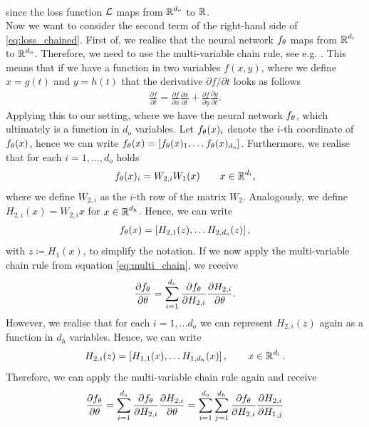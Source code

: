 \begin{example}
\begin{enumerate}
\begin{align*}
\end{align*}
since the loss function $\operatorname{\mathcal{L}}$ maps from $\operatorname{\mathbb{R}}^{d_o}$ to $\operatorname{\mathbb{R}}$.\\
Now we want to consider the second term of the right-hand side of \eqref{eq:loss_chained}. First of, we realise that the neural network $f_{\theta}$ maps from $\operatorname{\mathbb{R}}^{d_i}$ to $\operatorname{\mathbb{R}}^{d_o}$. Therefore, we need to use the multi-variable chain rule, see e.g. \cite{simmons1995calculus}. This means that if we have a function in two variables $f(x,y)$, where we define $x=g(t)$ and $y=h(t)$ that the derivative $\partial f/\partial t$ looks as follows
\begin{align}\label{eq:multi_chain}
\frac{\partial f}{\partial t} = \frac{\partial f}{\partial x} \frac{\partial x}{\partial t} + \frac{\partial f}{\partial y} \frac{\partial y}{\partial t}.
\end{align}
Applying this to our setting, where we have the neural network $f_{\theta}$, which ultimately is a function in $d_o$ variables. Let $f_{\theta}(x)_i$ denote the $i$-th coordinate of $f_{\theta}(x)$,
hence we can write $f_{\theta}(x) = [f_{\theta}(x)_1, \ldots f_{\theta}(x)_{d_o}]$. Furthermore, we realise that for each $i=1,\ldots,d_o$ holds
\begin{align*}
f_{\theta}(x)_i = W_{2,i} W_1(x) \qquad x\in \operatorname{\mathbb{R}}^{d_i},
\end{align*}
where we define $W_{2,i}$ as the $i$-th row of the matrix $W_2$. Analogously, we define $H_{2,i}(x) = W_{2,i}x$ for $x\in\operatorname{\mathbb{R}}^{d_h}$. Hence, we can write
\begin{align*}
f_{\theta}(x) = \left[H_{2,1}(z), \ldots H_{2,d_o}(z) \right],
\end{align*}
with $z\coloneqq H_1(x)$, to simplify the notation. If we now apply the multi-variable chain rule from equation \eqref{eq:multi_chain}, we receive
\begin{align*}
\frac{\partial f_{\theta}}{\partial \theta} = \sum_{i=1}^{d_o} \frac{\partial f_{\theta}}{\partial H_{2,i}} \frac{\partial H_{2,i}}{\partial \theta}.
\end{align*}
However, we realise that for each $i=1,\ldots d_o$ we can represent $H_{2,i}(z)$ again as a function in $d_h$ variables. Hence, we can write
\begin{align*}
H_{2,i}(z) = \left[H_{1,1}(x), \ldots H_{1,d_h}(x) \right], \qquad x\in\operatorname{\mathbb{R}}^{d_i}.
\end{align*}
Therefore, we can apply the multi-variable chain rule again and receive
\begin{align*}
\frac{\partial f_{\t}}{\partial \t} = \sum_{i=1}^{d_o} \frac{\partial f_{\t}}{\partial H_{2,i}} \frac{\partial H_{2,i}}{\partial \t} = \sum_{i=1}^{d_o} \sum_{j=1}^{d_h} \frac{\partial f_{\t}}{\partial H_{2,i}} \frac{\partial H_{2,i}}{\partial H_{1,j}}

\end{align*}
\end{enumerate}
\end{example}
